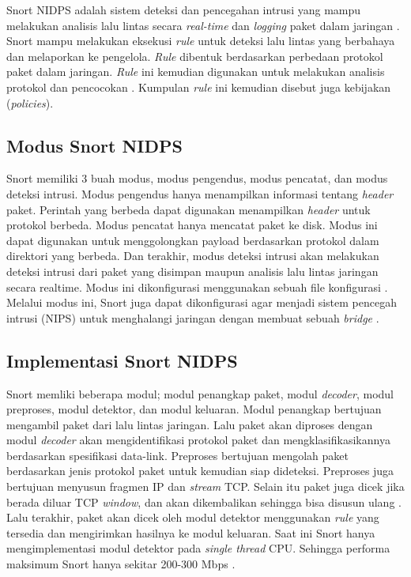     Snort NIDPS adalah sistem deteksi dan pencegahan intrusi yang mampu melakukan analisis lalu lintas secara \emph{real-time} dan \emph{logging} paket dalam jaringan \parencite{snortfaq}. Snort mampu melakukan eksekusi \emph{rule} untuk deteksi lalu lintas yang berbahaya dan melaporkan ke pengelola. \emph{Rule} dibentuk berdasarkan perbedaan protokol paket dalam jaringan. \emph{Rule} ini kemudian digunakan untuk melakukan analisis protokol dan pencocokan \parencite{snort}. Kumpulan \emph{rule} ini kemudian disebut juga kebijakan (\emph{policies}). 

  \subsection{Modus Snort NIDPS}

    Snort memiliki 3 buah modus, modus pengendus, modus pencatat, dan modus deteksi intrusi. Modus pengendus hanya menampilkan informasi tentang \emph{header} paket. Perintah yang berbeda dapat digunakan menampilkan \emph{header} untuk protokol berbeda. Modus pencatat hanya mencatat paket ke disk. Modus ini dapat digunakan untuk menggolongkan payload berdasarkan protokol dalam direktori yang berbeda. Dan terakhir, modus deteksi intrusi akan melakukan deteksi intrusi dari paket yang disimpan maupun analisis lalu lintas jaringan secara realtime. Modus ini dikonfigurasi menggunakan sebuah file konfigurasi \parencite{snortfaq}. Melalui modus ini, Snort juga dapat dikonfigurasi agar menjadi sistem pencegah intrusi (NIPS) untuk menghalangi jaringan dengan membuat sebuah \emph{bridge} \parencite{snort}.

  \subsection{Implementasi Snort NIDPS}

    Snort memliki beberapa modul; modul penangkap paket, modul \emph{decoder}, modul preproses, modul detektor, dan modul keluaran. Modul penangkap bertujuan mengambil paket dari lalu lintas jaringan. Lalu paket akan diproses dengan modul \emph{decoder} akan mengidentifikasi protokol paket dan mengklasifikasikannya berdasarkan spesifikasi data-link. Preproses bertujuan mengolah paket berdasarkan jenis protokol paket untuk kemudian siap dideteksi. Preproses juga bertujuan menyusun fragmen IP dan \emph{stream} TCP. Selain itu paket juga dicek jika berada diluar TCP \emph{window}, dan akan dikembalikan sehingga bisa disusun ulang \parencite{snort}. Lalu terakhir, paket akan dicek oleh modul detektor menggunakan \emph{rule} yang tersedia dan mengirimkan hasilnya ke modul keluaran. Saat ini Snort hanya mengimplementasi modul detektor pada \emph{single thread} CPU. Sehingga performa maksimum Snort hanya sekitar 200-300 Mbps \parencite{albin2012}.

